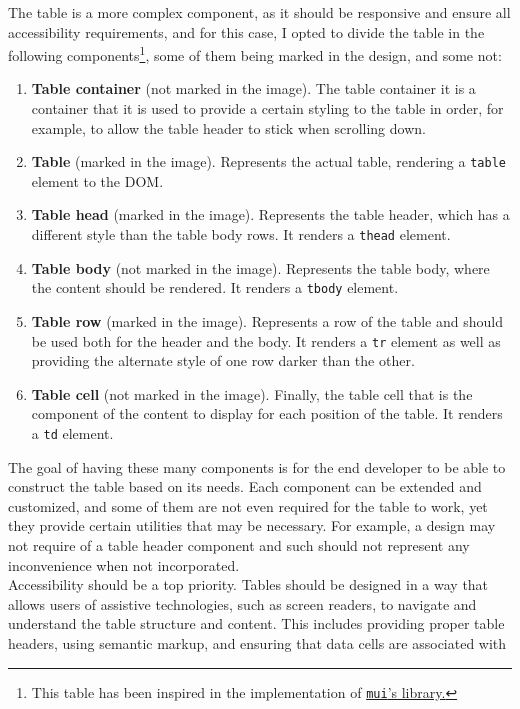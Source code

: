 \documentclass[./memory.tex]{subfiles}
\begin{document}
The table is a more complex component, as it should be responsive and ensure all
accessibility requirements, and for this case, I opted to divide the table in
the following components\footnote{This table has been inspired in the
	implementation of \href{https://mui.com/material-ui/react-table/}{\texttt{mui}'s
		library.}}, some of them being marked in the design, and some not:
\begin{enumerate}[label = -]
	\item\textbf{Table container} (not marked in the image). The table container
	it is a container that it is used to provide a certain styling to the
	table in order, for example, to allow the table header to stick when
	scrolling down.
	\item\textbf{Table} (marked in the image). Represents the actual table,
	rendering a \texttt{table} element to the DOM.
	\item\textbf{Table head} (marked in the image). Represents the table header,
	which has a different style than the table body rows. It renders a
	\texttt{thead} element.
	\item\textbf{Table body} (not marked in the image). Represents the table
	body, where the content should be rendered. It renders a \texttt{tbody}
	element.
	\item\textbf{Table row} (marked in the image). Represents a row of the table
	and should be used both for the header and the body. It renders a
	\texttt{tr} element as well as providing the alternate style of one row
	darker than the other.
	\item\textbf{Table cell} (not marked in the image). Finally, the table cell
	that is the component of the content to display for each position of the
	table. It renders a \texttt{td} element.
\end{enumerate}
The goal of having these many components is for the end developer to be able to
construct the table based on its needs. Each component can be extended and
customized, and some of them are not even required for the table to work, yet
they provide certain utilities that may be necessary. For example, a design may
not require of a table header component and such should not represent any
inconvenience when not incorporated.
\\
Accessibility should be a top priority. Tables should be designed in a way that
allows users of assistive technologies, such as screen readers, to navigate and
understand the table structure and content. This includes providing proper table
headers, using semantic markup, and ensuring that data cells are associated with
\end{document}
